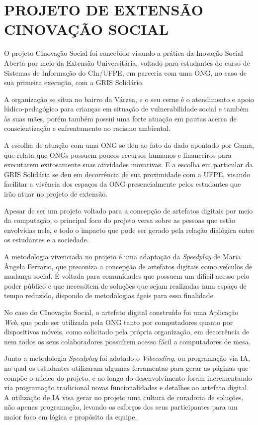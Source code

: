 \section{PROJETO DE EXTENSÃO CINOVAÇÃO SOCIAL}
\label{cinovacaosocial}

O projeto CInovação Social foi concebido visando a prática da Inovação Social Aberta por meio da Extensão Universitária, voltado para estudantes do curso de Sistemas de Informação do \gls{CIn}/\gls{UFPE}, em parceria com uma \gls{ONG}, no caso de sua primeira execução, com a GRIS Solidário.

A organização se situa no bairro da Várzea, e o seu cerne é o atendimento e apoio lúdico-pedagógico para crianças em situação de vulnerabilidade social e também às suas mães, porém também possui uma forte atuação em pautas acerca de conscientização e enfrentamento ao racismo ambiental.

A escolha de atuação com uma \gls{ONG} se deu ao fato do dado apontado por Gama, que relata que ONGs possuem poucos recursos humanos e financeiros para executarem exitosamente suas atividades inovativas. E a escolha em particular da GRIS Solidária se deu em decorrência de sua proximidade com a \gls{UFPE}, visando facilitar a vivência dos espaços da ONG presencialmente pelos estudantes que irão atuar no projeto de extensão.

Apesar de ser um projeto voltado para a concepção de artefatos digitais por meio da computação, o principal foco do projeto versa sobre as pessoas que estão envolvidas nele, e todo o impacto que pode ser gerado pela relação dialógica entre os estudantes e a sociedade.

A metodologia vivenciada no projeto é uma adaptação da \textit{Speedplay} de Maria Ângela Ferrario, que preconiza a concepção de artefatos digitais como veículos de mudança social. É voltada para comunidades que possuem um difícil acesso pelo poder público e que necessitem de soluções que sejam realizadas num espaço de tempo reduzido, dispondo de metodologias ágeis para essa finalidade.

No caso do CInovação Social, o artefato digital construído foi uma Aplicação \textit{Web}, que pode ser utilizada pela ONG tanto por computadores quanto por dispositivos móveis, como solicitado pela própria organização, em decorrência de nem todos os seus colaboradores possuírem acesso fácil a computadores de mesa.

Junto a metodologia \textit{Speedplay} foi adotado o \textit{Vibecoding}, ou programação via \gls{IA}, na qual os estudantes utilizaram algumas ferramentas para gerar as páginas que compõe o núcleo do projeto, e ao longo do desenvolvimento foram incrementando via programação tradicional novas funcionalidades e detalhes ao artefato digital. A utilização de \gls{IA} visa gerar no projeto uma cultura de curadoria de soluções, não apenas programação, levando os esforços dos seus participantes para um maior foco em lógica e propósito da equipe.

